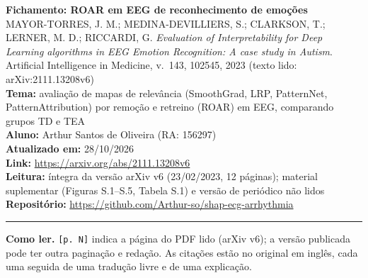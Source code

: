 \documentclass[11pt,a4paper]{article}
\begin{document}
\begin{center}
    {\LARGE \textbf{Fichamento: ROAR em EEG de reconhecimento de emoções}} \\[0.35em]
    {\large MAYOR-TORRES, J. M.; MEDINA-DEVILLIERS, S.; CLARKSON, T.; LERNER, M. D.; RICCARDI, G. \textit{Evaluation of Interpretability for Deep Learning algorithms in EEG Emotion Recognition: A case study in Autism}. Artificial Intelligence in Medicine, v.~143, 102545, 2023 (texto lido: arXiv:2111.13208v6)} \\[0.3em]
    \textbf{Tema:} avaliação de mapas de relevância (SmoothGrad, LRP, PatternNet, PatternAttribution) por remoção e retreino (ROAR) em EEG, comparando grupos TD e TEA \\[0.2em]
    \textbf{Aluno:} Arthur Santos de Oliveira (RA: 156297) \\[0.2em]
    \textbf{Atualizado em:} 28/10/2026 \\[0.2em]
    \textbf{Link:} \url{https://arxiv.org/abs/2111.13208v6} \\[0.2em]
    \textbf{Leitura:} íntegra da versão arXiv v6 (23/02/2023, 12 páginas); material suplementar (Figuras S.1--S.5, Tabela S.1) e versão de periódico não lidos \\[0.2em]
    \textbf{Repositório:} \url{https://github.com/Arthur-so/shap-ecg-arrhythmia}
\end{center}
\vspace{-0.5em}
\hrule
\vspace{0.8em}

\textbf{Como ler.} \texttt{[p. N]} indica a página do PDF lido (arXiv v6); a versão publicada pode ter outra paginação e redação. As citações estão no original em inglês, cada uma seguida de uma tradução livre e de uma explicação.
\end{document}
